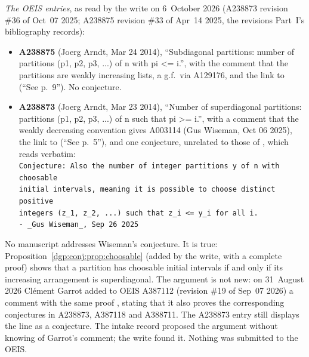 \documentclass[11pt,letterpaper]{article}
\numberwithin{equation}{section}
\theoremstyle{remark}\newtheorem{remark}[theorem]{Remark}
\begin{document}
\emph{The OEIS entries}, as read by the write on 6~October 2026 (A238873 revision \#36 of Oct~07 2025; A238875 revision \#33 of Apr~14 2025, the revisions Part~I's bibliography records):
\begin{itemize}
\item \textbf{A238875} (Joerg Arndt, Mar 24 2014), ``Subdiagonal partitions: number of partitions (p1, p2, p3, ...) of n with pi <= i.'', with the comment that the partitions are weakly increasing lists, a g.f.\ via A129176, and the link to \cite{abek} (``See p.~9''). No conjecture.
\item \textbf{A238873} (Joerg Arndt, Mar 23 2014), ``Number of superdiagonal partitions: partitions (p1, p2, p3, ...) of n such that pi >= i.'', with a comment that the weakly decreasing convention gives A003114 (Gus Wiseman, Oct 06 2025), the link to \cite{abek} (``See p.~5''), and one conjecture, unrelated to those of \cite{abek}, which reads verbatim:\\
\verb!Conjecture: Also the number of integer partitions y of n with choosable!\\
\verb!initial intervals, meaning it is possible to choose distinct positive!\\
\verb!integers (z_1, z_2, ...) such that z_i <= y_i for all i.!\\
\verb!- _Gus Wiseman_, Sep 26 2025!
\end{itemize}
No manuscript addresses Wiseman's conjecture. It is true: Proposition~\ref{dgp:conj:prop:choosable} (added by the write, with a complete proof) shows that a partition has choosable initial intervals if and only if its increasing arrangement is superdiagonal. The argument is not new: on 31~August 2026 Clément Garrot added to OEIS A387112 (revision \#19 of Sep~07 2026) a comment with the same proof \cite{oeisA387112}, stating that it also proves the corresponding conjectures in A238873, A387118 and A388711. The A238873 entry still displays the line as a conjecture. The intake record proposed the argument without knowing of Garrot's comment; the write found it. Nothing was submitted to the OEIS.
\end{document}
